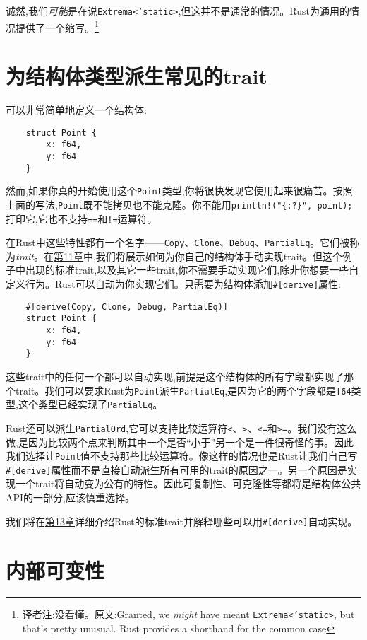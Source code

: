 诚然,我们\emph{可能}是在说\texttt{Extrema<'static>},但这并不是通常的情况。Rust为通用的情况提供了一个缩写。\footnote{译者注:没看懂。原文:Granted, we \emph{might} have meant \texttt{Extrema<'static>}, but that’s pretty unusual. Rust provides a shorthand for the common case}

\section{为结构体类型派生常见的trait}

可以非常简单地定义一个结构体:
\begin{verbatim}
    struct Point {
        x: f64,
        y: f64
    }
\end{verbatim}

然而,如果你真的开始使用这个\texttt{Point}类型,你将很快发现它使用起来很痛苦。按照上面的写法,\texttt{Point}既不能拷贝也不能克隆。你不能用\texttt{println!("\{:?\}", point);}打印它,它也不支持\texttt{==}和\texttt{!=}运算符。

在Rust中这些特性都有一个名字——\texttt{Copy}、\texttt{Clone}、\texttt{Debug}、\texttt{PartialEq}。它们被称为\emph{trait}。在\hyperref[ch11]{第11章}中,我们将展示如何为你自己的结构体手动实现trait。但这个例子中出现的标准trait,以及其它一些trait,你不需要手动实现它们,除非你想要一些自定义行为。Rust可以自动为你实现它们。只需要为结构体添加\texttt{\#[derive]}属性:
\begin{verbatim}
    #[derive(Copy, Clone, Debug, PartialEq)]
    struct Point {
        x: f64,
        y: f64
    }
\end{verbatim}

这些trait中的任何一个都可以自动实现,前提是这个结构体的所有字段都实现了那个trait。我们可以要求Rust为\texttt{Point}派生\texttt{PartialEq},是因为它的两个字段都是\texttt{f64}类型,这个类型已经实现了\texttt{PartialEq}。

Rust还可以派生\texttt{PartialOrd},它可以支持比较运算符\texttt{<}、\texttt{>}、\texttt{<=}和\texttt{>=}。我们没有这么做,是因为比较两个点来判断其中一个是否“小于”另一个是一件很奇怪的事。因此我们选择让\texttt{Point}值不支持那些比较运算符。像这样的情况也是Rust让我们自己写\texttt{\#[derive]}属性而不是直接自动派生所有可用的trait的原因之一。另一个原因是实现一个trait将自动变为公有的特性。因此可复制性、可克隆性等都将是结构体公共API的一部分,应该慎重选择。

我们将在\hyperref[ch13]{第13章}详细介绍Rust的标准trait并解释哪些可以用\texttt{\#[derive]}自动实现。

\section{内部可变性}\label{intermut}

